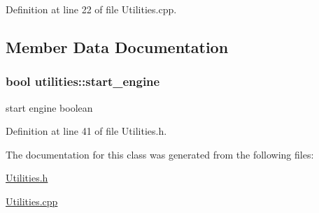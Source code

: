 \-Definition at line 22 of file \-Utilities.\-cpp.



\subsection{\-Member \-Data \-Documentation}
\hypertarget{classutilities_a00ad17c59af67ff895854c2510407513}{
\subsubsection[{start\-\_\-engine}]{\setlength{\rightskip}{0pt plus 5cm}bool {\bf utilities\-::start\-\_\-engine}}}\label{classutilities_a00ad17c59af67ff895854c2510407513}


start engine boolean 



\-Definition at line 41 of file \-Utilities.\-h.



\-The documentation for this class was generated from the following files\-:\begin{DoxyCompactItemize}
\item 
\hyperlink{_utilities_8h}{\-Utilities.\-h}\item 
\hyperlink{_utilities_8cpp}{\-Utilities.\-cpp}\end{DoxyCompactItemize}
